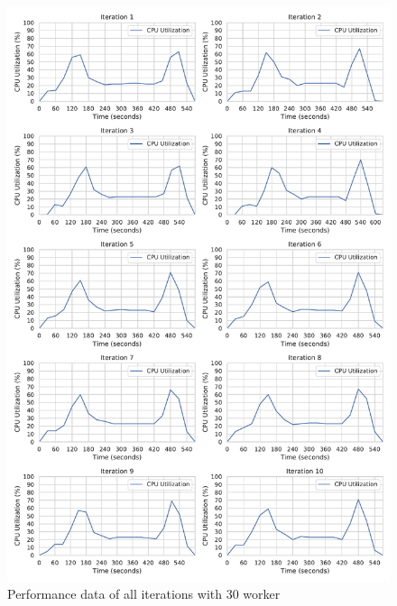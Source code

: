 \begin{figure}[h]
\centering
\includegraphics[scale=0.4]{images/07_evaluation/classification/30_worker_cpu_performance}
\caption{Performance data of all iterations with 30 worker}
\label{fig:appendix_eval_classification_static30}
\end{figure}

